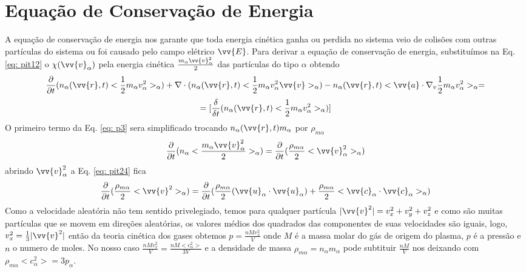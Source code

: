 \documentclass[12pt,oneside,a4paper]{abntex2}
\theoremstyle{definition}  %
\begin{document}
\section{Equação de Conservação de Energia}
A equação de conservação de energia nos garante que toda energia cinética ganha ou perdida no sistema veio de colisões com outras partículas do sistema ou foi causado pelo campo elétrico $\vv{E}$.
Para derivar a equação de conservação de energia, substituímos  na Eq. \ref{eq: pit12} o $\chi (\vv{v}_\alpha)$ pela energia cinética $\frac{m_\alpha \vv{v}^2_\alpha}{2}$ das partículas do tipo $\alpha$ obtendo
\begin{equation}
\label{eq: p3}
\frac{\partial }{\partial t}(n_\alpha(\vv{r},t)<\frac{1}{2}m_\alpha v_{\alpha}^2>_\alpha) + \nabla \cdot (n_\alpha(\vv{r},t)<\frac{1}{2}m_\alpha v_{\alpha}^2 \vv{v} >_\alpha) - n_\alpha(\vv{r},t)<\vv{a} \cdot \nabla_v \frac{1}{2}m_\alpha v_{\alpha}^2>_\alpha = 
\end{equation}
\begin{equation*}
=[\frac{\delta}{\delta t}(n_\alpha(\vv{r},t)<\frac{1}{2}m_\alpha v_{\alpha}^2>_\alpha)]
\end{equation*}
O primeiro termo da Eq. \ref{eq: p3} sera simplificado trocando $ n_\alpha(\vv{r},t) m_\alpha$ por $\rho_{m\alpha}$ 
\begin{equation}
\label{eq: pit24}
\frac{\partial }{\partial t}(n_\alpha<\frac{m_\alpha \vv{v}^2_\alpha}{2}>_\alpha)=\frac{\partial }{\partial t}(\frac{\rho_{m\alpha}}{2}<\vv{v}^2_\alpha>_\alpha)
\end{equation}
abrindo $\vv{v}^2_\alpha$ a Eq. \ref{eq: pit24} fica
\begin{equation}
\label{eq: pit24.1}
\frac{\partial }{\partial t}(\frac{\rho_{m\alpha}}{2}<\vv{v}^2>_\alpha)=\frac{\partial }{\partial t}(\frac{\rho_{m\alpha}}{2}(\vv{u}_\alpha \cdot \vv{u}_\alpha) + \frac{\rho_{m\alpha}}{2}<\vv{c}_\alpha \cdot \vv{c}_\alpha>_\alpha)
\end{equation} 
Como a velocidade aleatória não tem sentido privelegiado, temos para qualquer partícula $|\vv{v}^2| = v_x^2 + v_y^2 + v_z^2$ e como são muitas partículas que se movem em direções aleatórias, os valores médios dos quadrados das componentes de suas velocidades são iguais, logo, $v_x^2 = \frac{1}{3} |\vv{v}^2|$ então da teoria cinética dos gases obtemos $p=\frac{nMv_x^2}{V}$ onde $M$ é a massa molar do gás de origem do plasma, $p$ é a pressão e $n$ o numero de moles. No nosso caso $\frac{nMv_x^2}{V} = \frac{nM <c^2_\alpha>}{3V} $ e a densidade de massa $ \rho_{m\alpha} = n_\alpha m_\alpha$ pode subtituir $\frac{nM}{V}$ nos deixando com $\rho_{m\alpha}<c^2_\alpha>=3p_\alpha$. 
\end{document}
